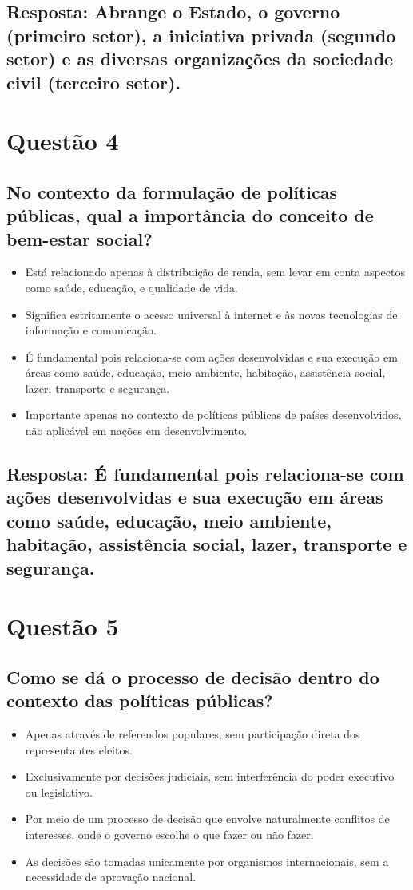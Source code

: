 \documentclass[
   article,       
   12pt,          
   oneside,       
   a4paper,       
   english,       
   brazil,        
   sumario=tradicional
   ]{abntex2}
\begin{document}
\subsection{Resposta: Abrange o Estado, o governo (primeiro setor), a iniciativa privada (segundo setor) e as diversas organizações da sociedade civil (terceiro setor).}

\section{Questão 4}
\subsection{No contexto da formulação de políticas públicas, qual a importância do conceito de bem-estar social?}
\begin{itemize}
    \item Está relacionado apenas à distribuição de renda, sem levar em conta aspectos como saúde, educação, e qualidade de vida.
    \item Significa estritamente o acesso universal à internet e às novas tecnologias de informação e comunicação.
    \item É fundamental pois relaciona-se com ações desenvolvidas e sua execução em áreas como saúde, educação, meio ambiente, habitação, assistência social, lazer, transporte e segurança.
    \item Importante apenas no contexto de políticas públicas de países desenvolvidos, não aplicável em nações em desenvolvimento.
\end{itemize}
\subsection{Resposta: É fundamental pois relaciona-se com ações desenvolvidas e sua execução em áreas como saúde, educação, meio ambiente, habitação, assistência social, lazer, transporte e segurança.}

\section{Questão 5}
\subsection{Como se dá o processo de decisão dentro do contexto das políticas públicas?}
\begin{itemize}
    \item Apenas através de referendos populares, sem participação direta dos representantes eleitos.
    \item Exclusivamente por decisões judiciais, sem interferência do poder executivo ou legislativo.
    \item Por meio de um processo de decisão que envolve naturalmente conflitos de interesses, onde o governo escolhe o que fazer ou não fazer.
    \item As decisões são tomadas unicamente por organismos internacionais, sem a necessidade de aprovação nacional.
\end{itemize}
\end{document}
